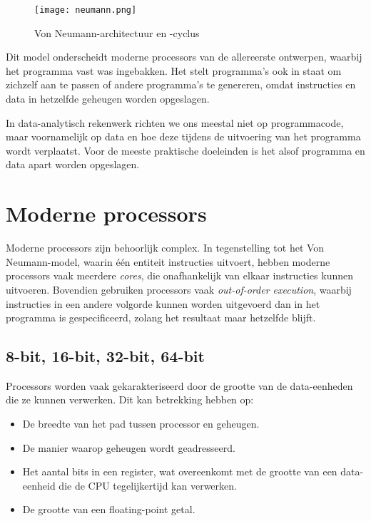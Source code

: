 \begin{figure}[ht]
    \centering
    \texttt{[image: neumann.png]}
    \caption{Von Neumann-architectuur en -cyclus}
    \label{fig:neumann}
\end{figure}

Dit model onderscheidt moderne processors van de allereerste ontwerpen, waarbij het programma vast was ingebakken. Het stelt programma's ook in staat om zichzelf aan te passen of andere programma's te genereren, omdat instructies en data in hetzelfde geheugen worden opgeslagen.

In data-analytisch rekenwerk richten we ons meestal niet op programmacode, maar voornamelijk op data en hoe deze tijdens de uitvoering van het programma wordt verplaatst. Voor de meeste praktische doeleinden is het alsof programma en data apart worden opgeslagen.

\section{Moderne processors}\label{sec:fp }
Moderne processors zijn behoorlijk complex. In tegenstelling tot het Von Neumann-model, waarin één entiteit instructies uitvoert, hebben moderne processors vaak meerdere \textit{cores}, die onafhankelijk van elkaar instructies kunnen uitvoeren. Bovendien gebruiken processors vaak \textit{out-of-order execution}, waarbij instructies in een andere volgorde kunnen worden uitgevoerd dan in het programma is gespecificeerd, zolang het resultaat maar hetzelfde blijft.

\subsection{8-bit, 16-bit, 32-bit, 64-bit}
Processors worden vaak gekarakteriseerd door de grootte van de data-eenheden die ze kunnen verwerken. Dit kan betrekking hebben op:
\begin{itemize}
\item De breedte van het pad tussen processor en geheugen.
\item De manier waarop geheugen wordt geadresseerd.
\item Het aantal bits in een register, wat overeenkomt met de grootte van een data-eenheid die de CPU tegelijkertijd kan verwerken.
\item De grootte van een floating-point getal.
\end{itemize}

